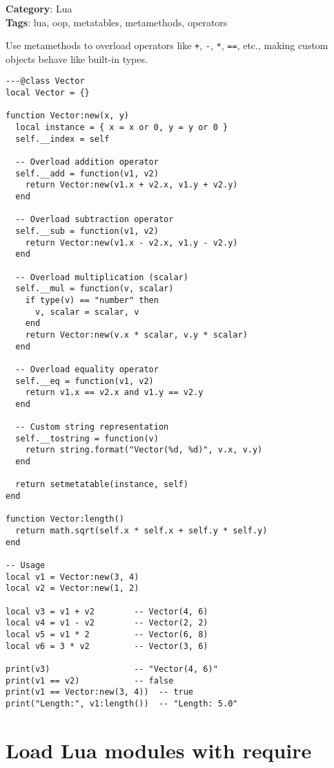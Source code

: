 {{{{{{\textbf{Category}: Lua\\ \textbf{Tags}: lua, oop, metatables, metamethods, operators
\vspace{0.5cm}

Use metamethods to overload operators like {\footnotesize \Verb§+§}, {\footnotesize \Verb§-§}, {\footnotesize \Verb§*§}, {\footnotesize \Verb§==§}, etc., making custom objects behave like built-in types.

\begin{Exa*}{}
\begin{Verbatim}[fontsize=\footnotesize, breaklines, breakanywhere]
---@class Vector
local Vector = {}

function Vector:new(x, y)
  local instance = { x = x or 0, y = y or 0 }
  self.__index = self

  -- Overload addition operator
  self.__add = function(v1, v2)
    return Vector:new(v1.x + v2.x, v1.y + v2.y)
  end

  -- Overload subtraction operator
  self.__sub = function(v1, v2)
    return Vector:new(v1.x - v2.x, v1.y - v2.y)
  end

  -- Overload multiplication (scalar)
  self.__mul = function(v, scalar)
    if type(v) == "number" then
      v, scalar = scalar, v
    end
    return Vector:new(v.x * scalar, v.y * scalar)
  end

  -- Overload equality operator
  self.__eq = function(v1, v2)
    return v1.x == v2.x and v1.y == v2.y
  end

  -- Custom string representation
  self.__tostring = function(v)
    return string.format("Vector(%d, %d)", v.x, v.y)
  end

  return setmetatable(instance, self)
end

function Vector:length()
  return math.sqrt(self.x * self.x + self.y * self.y)
end

-- Usage
local v1 = Vector:new(3, 4)
local v2 = Vector:new(1, 2)

local v3 = v1 + v2        -- Vector(4, 6)
local v4 = v1 - v2        -- Vector(2, 2)
local v5 = v1 * 2         -- Vector(6, 8)
local v6 = 3 * v2         -- Vector(3, 6)

print(v3)                 -- "Vector(4, 6)"
print(v1 == v2)           -- false
print(v1 == Vector:new(3, 4))  -- true
print("Length:", v1:length())  -- "Length: 5.0"
\end{Verbatim}
\end{Exa*}

\section{Load Lua modules with require}

}}}}}}
